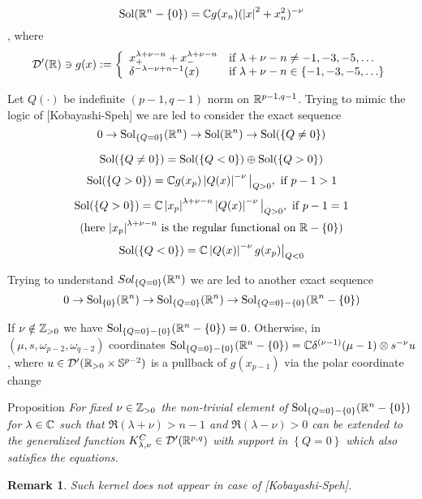 \documentclass[8pt,pdf,notes]{beamer}
\newcommand{\Sol}{\mbox{Sol}}
\newcommand{\D}{\mathcal{D}}
\newenvironment{prop}{\begin{exampleblock}{Proposition}\it}{\end{exampleblock}}
\theoremstyle{mystyle}
\newtheorem*{remark}{Remark}
\begin{document}
\begin{frame}
\begin{theorem}
	\[\Sol(\R^n-\mycbra{0})=\C g(x_n)(\myabs{x}^2+x_n^2)^{-\nu}\], where
	\[\mathcal{D}'(\mathbb{R})\ni g(x):=\left\{\begin{array}{ll}
				x_+^{\lambda+\nu-n}+x_-^{\lambda+\nu-n}&\mbox{if }\lambda+\nu-n\neq-1,-3,-5,\hdots\\
				\delta^{-\lambda-\nu+n-1}(x)&\mbox{if }\lambda+\nu-n\in\left\{-1,-3,-5,\hdots\right\}\\
		\end{array}\right.\]
\end{theorem}
Let $Q(\cdot)$ be indefinite $(p-1,q-1)$ norm on $\mathbb{R}^{p-1,q-1}$.  
Trying to mimic the logic of [Kobayashi-Speh] we are led to consider the exact sequence
\[0\rightarrow \Sol_{\mycbra{Q=0}}(\R^n)\rightarrow \Sol(\R^n)\rightarrow\Sol(
	\mycbra{Q\neq0})\]
\begin{theorem}[$O(p,q),\;n:=(p-1)+(q-1)$]
	\[\Sol(\mycbra{Q\neq0})=\Sol(\mycbra{Q<0})\oplus \Sol(\mycbra{Q>0})\]
	\[\Sol(\mycbra{Q>0})=\C g(x_p)\myabs{Q(x)}^{-\nu}\big|_{Q>0},\mbox{ if }p-1>1\]
	\begin{multline*}\Sol(\mycbra{Q>0})=\C \myabs{x_p}^{\lambda+\nu-n}\myabs{Q(x)}^{-\nu}\big|_{Q>0},\mbox{ if }p-1=1\\
	\mbox{(here $\myabs{x_p}^{\lambda+\nu-n}$ is the regular functional on $\R-\mycbra{0}$)}\end{multline*}
	\[\Sol(\mycbra{Q<0})=\C\myabs{Q(x)}^{-\nu}g(x_p)\big|_{Q<0}\]
\end{theorem}
\end{frame}
\begin{frame}
	Trying to understand $Sol_{\left\{Q=0\right\}}(\mathbb{R}^n)$ we are led to another exact sequence
	\[0\rightarrow\Sol_{\mycbra{0}}(\R^n)\rightarrow\Sol_{\mycbra{Q=0}}(\R^n)\rightarrow
	\Sol_{\mycbra{Q=0}-\mycbra{0}}(\R^n-\mycbra{0})\]

\begin{theorem}
	If $\nu\notin\mathbb{Z}_{ >0 }$ we have $\Sol_{\mycbra{Q=0}-\mycbra{0}}(\R^n-\mycbra{0})=0$. Otherwise,
	in $(\mu,s,\omega_{ p-2 },\omega_{ q-2 })$ coordinates\footnotemark
	$\Sol_{\mycbra{Q=0}-\mycbra{0}}(\R^n-\mycbra{0})=\C\delta^{ (\nu-1) }(\mu-1)
	\otimes s^{-\nu }u$, where $u\in\mathcal{ D }'(\mathbb{R}_{ >0 }\times\mathbb{ S }^{ p-2 })$
	is a pullback of $g(x_{ p-1 })$ via the polar coordinate change\footnotemark
\end{theorem}
\begin{prop}
	For fixed $\nu\in\mathbb{Z}_{ >0 }$
	the non-trivial element of $\Sol_{\mycbra{Q=0}-\mycbra{0}}(\R^n-\mycbra{0})$ for $\lambda\in\mathbb{C}$ such that 
	$\Re(\lambda+\nu)>n-1$ and $\Re(\lambda-\nu)>0$ can be extended to the generalized function 
	$K_{\lambda,\nu}^C\in\D'(\R^{p,q})$ with support in $\left\{ Q=0 \right\}$ which also satisfies the equations.
\end{prop}
\begin{remark}
	Such kernel does not appear in case of [Kobayashi-Speh].
\end{remark}
\end{frame}
\end{document}
